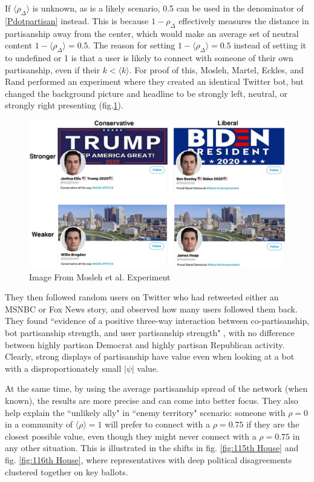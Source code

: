 \documentclass[preprint,review,12pt]{elsarticle}
\begin{document}
If $\langle \rho_{\Delta} \rangle$ is unknown, as is a likely scenario,  0.5 can be used in the denominator of \ref{Pdotpartisan} instead. This is because $1 - \rho_{\Delta}$ effectively measures the distance in partisanship away from the center, which would make an average set of neutral content $ 1 - \langle\rho_{\Delta} \rangle = 0.5$. The reason for setting $ 1 - \langle\rho_{\Delta} \rangle = 0.5$ instead of setting it to undefined or 1 is that a user is likely to connect with someone of their own partisanship, even if their $k < \langle k \rangle$. For proof of this, Mosleh, Martel, Eckles, and Rand performed an experiment where they created an identical Twitter bot, but changed the background picture and headline to be strongly left, neutral, or strongly right presenting (fig.\ref{fig:Mosleh Image}).
 \begin{figure}[htp]
    \centering
    \includegraphics[width=12cm]{mosleh_image.jpg}
    \caption{Image From Mosleh et al. Experiment \cite{mosleh2020shared}}
    \label{fig:Mosleh Image}
\end{figure}

They then followed random users on Twitter who had retweeted either an MSNBC or Fox News story, and observed how many users followed them back. They found ``evidence of a positive three-way interaction between co-partisanship, bot partisanship strength, and user partisanship strength" \cite{mosleh2020shared}, with no difference between highly partisan Democrat and highly partisan Republican activity. Clearly, strong displays of partisanship have value even when looking at a bot with a disproportionately small $|\psi|$ value.

At the same time, by using the average partisanship spread of the network (when known), the results are more precise and can come into better focus. They also help explain the ``unlikely ally" in ``enemy territory" scenario: someone with $\rho = 0$ in a community of $\langle \rho \rangle=1$ will prefer to connect with a $\rho = 0.75$ if they are the closest possible value, even though they might never connect with a $\rho = 0.75$ in any other situation. This is illustrated in the shifts in fig. \ref{fig:115th House} and fig. \ref{fig:116th House}, where representatives with deep political disagreements clustered together on key ballots.
\end{document}
